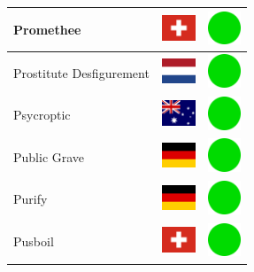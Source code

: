 \documentclass[12pt, a4paper, twoside]{report}
\begin{document}
\begin{center}
\begin{longtable}{|p{5cm}|p{2cm}|p{2cm}|}
Promethee & \includegraphics[width=1cm]{4x3/ch} & \includegraphics[width=1cm]{likes/y} \\ \hline
Prostitute Desfigurement & \includegraphics[width=1cm]{4x3/nl} & \includegraphics[width=1cm]{likes/y} \\ \hline
Psycroptic & \includegraphics[width=1cm]{4x3/au} & \includegraphics[width=1cm]{likes/y} \\ \hline
Public Grave & \includegraphics[width=1cm]{4x3/de} & \includegraphics[width=1cm]{likes/y} \\ \hline
Purify & \includegraphics[width=1cm]{4x3/de} & \includegraphics[width=1cm]{likes/y} \\ \hline
Pusboil & \includegraphics[width=1cm]{4x3/ch} & \includegraphics[width=1cm]{likes/y} \\ \hline

\end{longtable}
\end{center}
\end{document}
